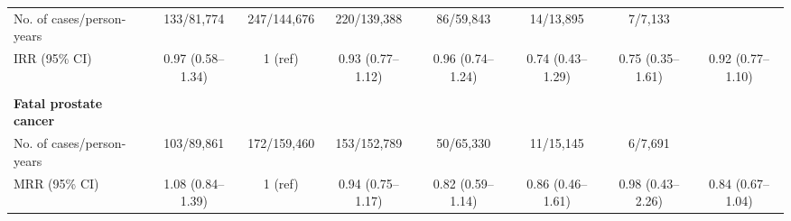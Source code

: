 \begin{table}
\begin{adjustbox}{max width=\textwidth}
\begin{tabular}{lccccccc}
No. of cases/person-years       & 133/81,774           & 247/144,676          & 220/139,388          & 86/59,843            & 14/13,895             & 7/7,133              &                                                                                   \\
IRR (95\% CI)                   & 0.97 (0.58--1.34)    & 1 (ref)              & 0.93 (0.77--1.12)    & 0.96 (0.74--1.24)    & 0.74 (0.43--1.29)    & 0.75 (0.35--1.61)    & 0.92 (0.77--1.10)                                                                 \\
                                &                      &                      &                      &                      &                      &                      &                                                                                   \\
{\bf Fatal prostate cancer}     &                      &                      &                      &                      &                      &                      &                                                                                   \\
No. of cases/person-years       & 103/89,861           & 172/159,460          & 153/152,789          & 50/65,330            & 11/15,145            & 6/7,691              &                                                                                   \\
MRR (95\% CI)                   & 1.08 (0.84--1.39)    & 1 (ref)              & 0.94 (0.75--1.17)    & 0.82 (0.59--1.14)    & 0.86 (0.46--1.61)    & 0.98 (0.43--2.26)    & 0.84 (0.67--1.04)                                                                 \\ \hline
\end{tabular}
\end{adjustbox}
\end{table}